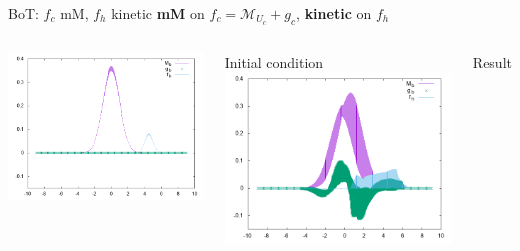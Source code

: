 \documentclass{beamer}
\begin{document}
  \begin{frame}{BoT: $f_c$ mM, $f_h$ kinetic}
  	\textbf{mM} on $f_c = \mathcal{M}_{U_c}+g_c$, \textbf{kinetic} on $f_h$
  	\begin{columns}[c]
        \includegraphics[width=\textwidth]{img/Mgbfhinit_coupe.png}

        Initial condition
        \includegraphics[width=\textwidth]{img/Mgbfhvp_coupe.png}

        Result
    \end{columns}
  \end{frame}
\end{document}
